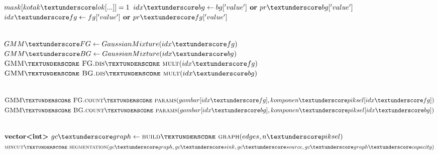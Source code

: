 \begin{algorithm}                     
\begin{algorithmic}                    %

    \\

            \State $mask[kotak\textunderscore lok[...]] = 1$ 
        \EndIf
        \State $idx\textunderscore bg \gets bg['value'] \textbf{ or } pr\textunderscore bg['value']$
        \State $idx\textunderscore fg \gets fg['value'] \textbf{ or } pr\textunderscore fg['value']$
    \EndFunction

    \\ 
        \State $GMM\textunderscore FG \gets GaussianMixture(idx\textunderscore fg)$
        \State $GMM\textunderscore BG \gets GaussianMixture(idx\textunderscore bg)$
        \State $\Call{GMM\textunderscore FG.dis\textunderscore mult}{idx\textunderscore fg}$
        \State $\Call{GMM\textunderscore BG.dis\textunderscore mult}{idx\textunderscore bg}$
    \EndFunction

    \\ 
        \State $\Call{GMM\textunderscore FG.count\textunderscore params}{gambar[idx\textunderscore fg], komponen\textunderscore piksel[idx\textunderscore fg]}$
        \State $\Call{GMM\textunderscore BG.count\textunderscore params}{gambar[idx\textunderscore bg], komponen\textunderscore piksel[idx\textunderscore bg]}$
    \EndFunction

    \\ 
        \State $\textbf{vector<int> } gc\textunderscore graph \gets \Call{build\textunderscore graph}{edges, n\textunderscore piksel}$
        \State $\Call{mincut\textunderscore segmentation}{gc\textunderscore graph, gc\textunderscore sink, gc\textunderscore source, gc\textunderscore graph\textunderscore capacity}$
    \EndFunction
\end{algorithmic}
\end{algorithm}

